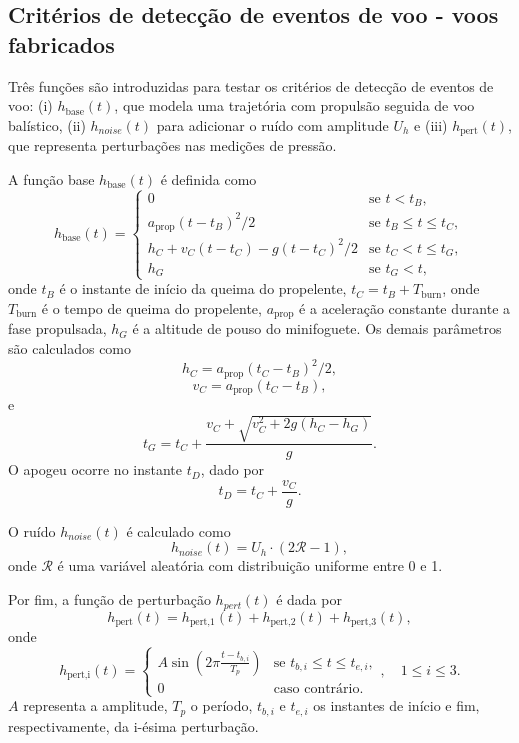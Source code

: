 \documentclass[12pt,a4paper]{article}
\begin{document}
\subsection{Critérios de detecção de eventos de voo - voos fabricados}
\label{sec:manufacturedflights}

Três funções são introduzidas para testar os critérios de detecção de eventos de voo: (i) $h_\text{base}(t)$, que modela uma trajetória com propulsão seguida de voo balístico, (ii) $h_{noise}(t)$ para adicionar o ruído com amplitude $U_h$ e (iii) $h_\text{pert}(t)$, que representa perturbações nas medições de pressão.

A função base $h_\text{base}(t)$ é definida como
\begin{equation}
h_\text{base}(t)=
\begin{cases}
0 & \text{se } t < t_B, \\
a_\text{prop}(t-t_B)^2/2 & \text{se } t_B\le t \le t_C, \\
h_C+v_{C}(t-t_C)-g(t-t_C)^2/2 & \text{se } t_C < t \le t_G, \\
h_G & \text{se } t_G < t,
\end{cases}
\end{equation}
onde $t_B$ é o instante de início da queima do propelente, $t_C=t_B+T_\text{burn}$, onde $T_\text{burn}$ é o tempo de queima do propelente, $a_\text{prop}$ é a aceleração constante durante a fase propulsada,  $h_G$ é a altitude de pouso do minifoguete. Os demais parâmetros são calculados como
\begin{equation}
h_C=a_\text{prop}(t_C-t_B)^2/2,
\end{equation} 
\begin{equation}
v_C=a_\text{prop}(t_C-t_B),
\end{equation} 
e
\begin{equation}
t_G=t_C+\frac{v_C+\sqrt{v_C^2+2g(h_C-h_G)}}{g}.
\end{equation}
O apogeu ocorre no instante $t_D$, dado por
\begin{equation}
t_D=t_C+\frac{v_C}{g}.
\end{equation}

O ruído $h_{noise}(t)$ é calculado como
\begin{equation}
h_{noise}(t)=U_h\cdot(2\mathcal{R}-1),
\end{equation}
onde $\mathcal{R}$ é uma variável aleatória com distribuição uniforme entre 0 e 1.

Por fim, a função de perturbação $h_{pert}(t)$ é dada por
\begin{equation}
h_\text{pert}(t)=h_\text{pert,1}(t)+h_\text{pert,2}(t)+h_\text{pert,3}(t),
\end{equation}
onde
\begin{equation}
h_\text{pert,i}(t)=
\begin{cases}
A\sin\left(2\pi\frac{t-t_{b,i}}{T_p}\right) & \text{se } t_{b,i} \le t \le t_{e,i}, \\
0 & \text{caso contrário.}
\end{cases},\quad 1\le i \le 3.
\end{equation}
$A$ representa a amplitude, $T_p$ o período, $t_{b,i}$ e $t_{e,i}$ os instantes de início e fim, respectivamente, da i-ésima perturbação.
\end{document}
